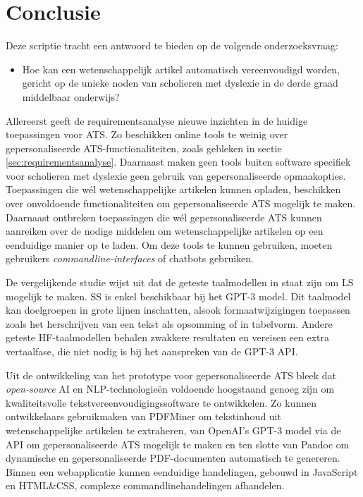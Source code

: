 
\chapter{Conclusie}%
\label{ch:conclusie}

Deze scriptie tracht een antwoord te bieden op de volgende onderzoeksvraag:

\begin{itemize}
	\item Hoe kan een wetenschappelijk artikel automatisch vereenvoudigd worden, gericht op de unieke noden van scholieren met dyslexie in de derde graad middelbaar onderwijs?
\end{itemize}

Allereerst geeft de requirementsanalyse nieuwe inzichten in de huidige toepassingen voor ATS. Zo beschikken online tools te weinig over gepersonaliseerde ATS-functionaliteiten, zoals gebleken in sectie \ref{sec:requirementsanalyse}. Daarnaast maken geen tools buiten software specifiek voor scholieren met dyslexie geen gebruik van gepersonaliseerde opmaakopties. Toepassingen die wél wetenschappelijke artikelen kunnen opladen, beschikken over onvoldoende functionaliteiten om gepersonaliseerde ATS mogelijk te maken. Daarnaast ontbreken toepassingen die wél gepersonaliseerde ATS kunnen aanreiken over de nodige middelen om wetenschappelijke artikelen op een eenduidige manier op te laden. Om deze tools te kunnen gebruiken, moeten gebruikers \textit{commandline-interfaces} of chatbots gebruiken.

\medspace

De vergelijkende studie wijst uit dat de geteste taalmodellen in staat zijn om LS mogelijk te maken. SS is enkel beschikbaar bij het GPT-3 model. Dit taalmodel kan doelgroepen in grote lijnen inschatten, alsook formaatwijzigingen toepassen zoals het herschrijven van een tekst als opsomming of in tabelvorm. Andere geteste HF-taalmodellen behalen zwakkere resultaten en vereisen een extra vertaalfase, die niet nodig is bij het aanspreken van de GPT-3 API.

\medspace

Uit de ontwikkeling van het prototype voor gepersonaliseerde ATS bleek dat \textit{open-source} AI en NLP-technologieën voldoende hoogstaand genoeg zijn om kwaliteitsvolle tekstvereenvoudigingssoftware te ontwikkelen. Zo kunnen ontwikkelaars gebruikmaken van PDFMiner om tekstinhoud uit wetenschappelijke artikelen te extraheren, van OpenAI's GPT-3 model via de API om gepersonaliseerde ATS mogelijk te maken en ten slotte van Pandoc om dynamische en gepersonaliseerde PDF-documenten automatisch te genereren. Binnen een webapplicatie kunnen eenduidige handelingen, gebouwd in JavaScript en HTML\&CSS, complexe commandlinehandelingen afhandelen.

